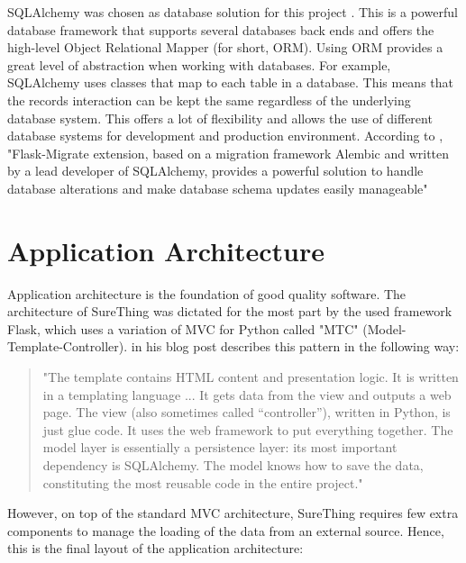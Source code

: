 SQLAlchemy was chosen as database solution for this project \citep{documentation:SqlAlchemy}. This is a powerful database framework that supports several databases back ends and offers the high-level Object Relational Mapper (for short, ORM). Using ORM provides a great level of abstraction when working with databases. For example, SQLAlchemy uses classes that map to each table in a database. This means that the records interaction can be kept the same regardless of the underlying database system. This offers a lot of flexibility and allows the use of different database systems for development and production environment. According to \citet{book:Grindberg2014FlaskWebDevelopment}, "Flask-Migrate extension, based on a migration framework Alembic and written by a lead developer of SQLAlchemy, provides a powerful solution to handle database alterations and make database schema updates easily manageable"

\section{Application Architecture}
\label{sec:applicationarchitecture}
Application architecture is the foundation of good quality software. The architecture of SureThing was dictated for the most part by the used framework Flask, which uses a variation of MVC for Python called "MTC" (Model-Template-Controller). \citet{article:goodArchitecture} in his blog post describes this pattern in the following way:

\begin{quote}
"The template contains HTML content and presentation logic. It is written in a templating language ... It gets data from the view and outputs a web page. The view (also sometimes called “controller”), written in Python, is just glue code. It uses the web framework to put everything together. The model layer is essentially a persistence layer: its most important dependency is SQLAlchemy. The model knows how to save the data, constituting the most reusable code in the entire project."
\end{quote}

However, on top of the standard MVC architecture, SureThing requires few extra components to manage the loading of the data from an external source. Hence, this is the final layout of the application architecture:

